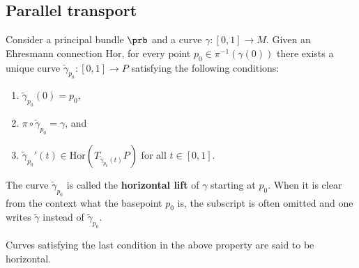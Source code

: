 \subsection{Parallel transport}

    \begin{definition}
        Consider a principal bundle $\prb$ and a curve $\gamma:[0,1]\rightarrow M$. Given an Ehresmann connection $\mathrm{Hor}$, for every point $p_0\in\pi^{-1}(\gamma(0))$ there exists a unique curve $\widetilde{\gamma}_{p_0}:[0,1]\rightarrow P$ satisfying the following conditions:
        \begin{enumerate}
            \item $\widetilde{\gamma}_{p_0}(0) = p_0$,
            \item $\pi\circ\widetilde{\gamma}_{p_0} = \gamma$, and
            \item $\widetilde{\gamma}_{p_0}'(t)\in\mathrm{Hor}(T_{\widetilde{\gamma}_{p_0}(t)}P)$ for all $t\in[0,1]$.
        \end{enumerate}
        The curve $\widetilde{\gamma}_{p_0}$ is called the \textbf{horizontal lift} of $\gamma$ starting at $p_0$. When it is clear from the context what the basepoint $p_0$ is, the subscript is often omitted and one writes $\widetilde{\gamma}$ instead of $\widetilde{\gamma}_{p_0}$.
    \end{definition}
    \begin{remark}
        Curves satisfying the last condition in the above property are said to be horizontal.
    \end{remark}

